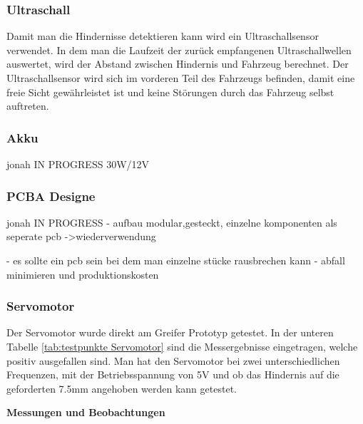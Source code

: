 \subsubsection{Ultraschall}

Damit man die Hindernisse detektieren kann wird ein Ultraschallsensor verwendet. In dem man die Laufzeit der zurück empfangenen Ultraschallwellen auswertet, wird der Abstand zwischen Hindernis und Fahrzeug berechnet. Der Ultraschallsensor wird sich im vorderen Teil des Fahrzeugs befinden, damit eine freie Sicht gewährleistet ist und keine Störungen durch das Fahrzeug selbst auftreten.

\subsubsection{Akku}

jonah
IN PROGRESS
30W/12V

\subsubsection{PCBA Designe}

jonah
IN PROGRESS
- aufbau modular,gesteckt, einzelne komponenten als seperate pcb ->wiederverwendung

- es sollte ein pcb sein bei dem man einzelne stücke rausbrechen kann
- abfall minimieren und produktionskosten



\subsubsection{Servomotor}

Der Servomotor wurde direkt am Greifer Prototyp getestet. In der unteren Tabelle \ref{tab:testpunkte Servomotor} sind die Messergebnisse eingetragen, welche positiv ausgefallen sind. Man hat den Servomotor bei zwei unterschiedlichen Frequenzen, mit der Betriebsspannung von 5V und ob das Hindernis auf die geforderten 7.5mm angehoben werden kann getestet.


\textbf{Messungen und Beobachtungen}

